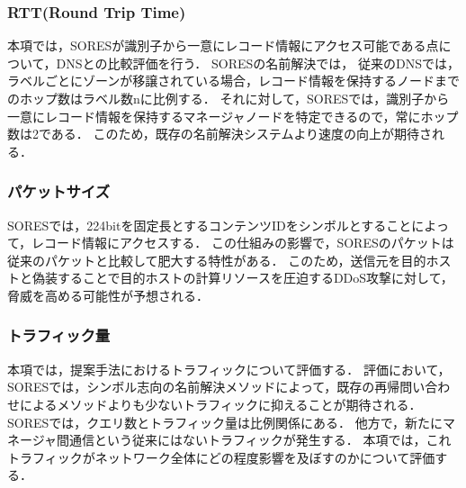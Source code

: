 \subsubsection{RTT(Round Trip Time)}
本項では，SORESが識別子から一意にレコード情報にアクセス可能である点について，DNSとの比較評価を行う．
SORESの名前解決では，
従来のDNSでは，ラベルごとにゾーンが移譲されている場合，レコード情報を保持するノードまでのホップ数はラベル数nに比例する．
それに対して，SORESでは，識別子から一意にレコード情報を保持するマネージャノードを特定できるので，常にホップ数は2である．
このため，既存の名前解決システムより速度の向上が期待される．
\subsubsection{パケットサイズ}
SORESでは，224bitを固定長とするコンテンツIDをシンボルとすることによって，レコード情報にアクセスする．
この仕組みの影響で，SORESのパケットは従来のパケットと比較して肥大する特性がある．
このため，送信元を目的ホストと偽装することで目的ホストの計算リソースを圧迫するDDoS攻撃に対して，脅威を高める可能性が予想される．
\subsubsection{トラフィック量}
本項では，提案手法におけるトラフィックについて評価する．
評価において，
SORESでは，シンボル志向の名前解決メソッドによって，既存の再帰問い合わせによるメソッドよりも少ないトラフィックに抑えることが期待される．
SORESでは，クエリ数とトラフィック量は比例関係にある．
他方で，新たにマネージャ間通信という従来にはないトラフィックが発生する．
本項では，これトラフィックがネットワーク全体にどの程度影響を及ぼすのかについて評価する．

